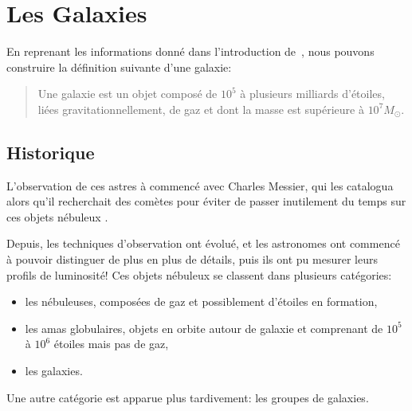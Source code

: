 
	\section{Les Galaxies}%
		En reprenant les informations donné dans l'introduction de~\cite{binntre},
		nous pouvons construire la définition suivante d'une galaxie:
		\begin{quote}
			Une galaxie est un objet composé de $10^5$ à plusieurs milliards d'étoiles, liées gravitationnellement, de gaz et dont la masse
			est supérieure à $10^7M_\odot$.
		\end{quote}

		\subsection{Historique}

			L'observation de ces astres à commencé avec Charles Messier, qui les
			catalogua alors qu'il recherchait des comètes pour éviter de passer
			inutilement du temps sur ces objets \og nébuleux \fg{}.

			Depuis, les techniques d'observation ont évolué, et les astronomes ont
			commencé à pouvoir distinguer de plus en plus de détails, puis ils ont pu
			mesurer leurs profils de luminosité! Ces objets nébuleux se classent dans
			plusieurs catégories:
			\begin{itemize}
				\item les nébuleuses, composées de gaz et possiblement d'étoiles en formation,
				\item les amas globulaires, objets en orbite autour de galaxie et comprenant de
					$10^5$ à $10^6$ étoiles mais pas de gaz,
				\item les galaxies.
			\end{itemize}
			Une autre catégorie est apparue plus tardivement: les groupes de galaxies.

